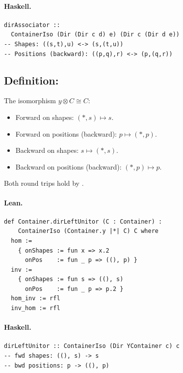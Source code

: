 \documentclass[11pt,a4paper]{article}
\begin{document}
\paragraph{Haskell.}
\begin{lstlisting}[style=haskell]
dirAssociator ::
  ContainerIso (Dir (Dir c d) e) (Dir c (Dir d e))
-- Shapes: ((s,t),u) <-> (s,(t,u))
-- Positions (backward): ((p,q),r) <-> (p,(q,r))
\end{lstlisting}


\subsection{Definition: }

\begin{defn}
The isomorphism $y \otimes C \cong C$:
\begin{itemize}
  \item Forward on shapes: $(\ast, s) \mapsto s$.
  \item Forward on positions (backward): $p \mapsto (\ast, p)$.
  \item Backward on shapes: $s \mapsto (\ast, s)$.
  \item Backward on positions (backward): $(\ast, p) \mapsto p$.
\end{itemize}
Both round trips hold by .
\end{defn}

\paragraph{Lean.}
\begin{lstlisting}[style=lean]
def Container.dirLeftUnitor (C : Container) :
    ContainerIso (Container.y |*| C) C where
  hom :=
    { onShapes := fun x => x.2
      onPos    := fun _ p => ((), p) }
  inv :=
    { onShapes := fun s => ((), s)
      onPos    := fun _ p => p.2 }
  hom_inv := rfl
  inv_hom := rfl
\end{lstlisting}

\paragraph{Haskell.}
\begin{lstlisting}[style=haskell]
dirLeftUnitor :: ContainerIso (Dir YContainer c) c
-- fwd shapes: ((), s) -> s
-- bwd positions: p -> ((), p)
\end{lstlisting}
\end{document}
